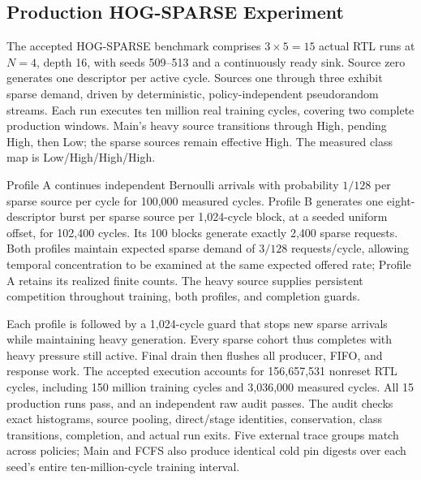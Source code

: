 \subsection{Production HOG-SPARSE Experiment}
The accepted HOG-SPARSE benchmark comprises $3\times5=15$ actual RTL runs at
$N=4$, depth 16, with seeds 509--513 and a continuously ready sink. Source zero
generates one descriptor per active cycle. Sources one through three exhibit
sparse demand, driven by deterministic, policy-independent pseudorandom streams.
Each run executes ten million real training cycles, covering two complete
production windows. Main's heavy source transitions through High, pending High, then Low;
the sparse sources remain effective High. The measured class map is
Low/High/High/High.

Profile A continues independent Bernoulli arrivals with probability $1/128$
per sparse source per cycle for 100,000 measured cycles. Profile B generates
one eight-descriptor burst per sparse source per 1,024-cycle block, at a seeded
uniform offset, for 102,400 cycles. Its 100 blocks generate exactly 2,400 sparse
requests. Both profiles maintain expected sparse demand of $3/128$ requests/cycle,
allowing temporal concentration to be examined at the same expected offered
rate; Profile A retains its realized finite counts. The heavy source supplies persistent
competition throughout training, both profiles, and completion guards.

Each profile is followed by a 1,024-cycle guard that stops new sparse arrivals
while maintaining heavy generation. Every sparse cohort thus completes with heavy
pressure still active. Final drain then flushes all producer, FIFO, and
response work. The accepted execution accounts for 156,657,531 nonreset RTL
cycles, including 150 million training cycles and 3,036,000 measured cycles.
All 15 production runs pass, and an independent raw audit passes. The audit
checks exact histograms, source pooling, direct/stage identities, conservation,
class transitions, completion, and actual run exits. Five external trace groups
match across policies; Main and FCFS also produce identical cold pin digests over
each seed's entire ten-million-cycle training interval.

